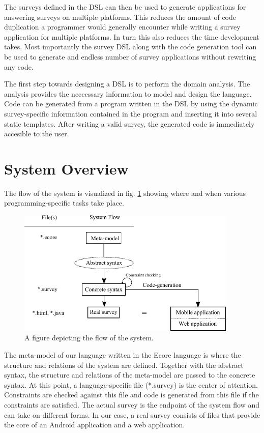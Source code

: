 \documentclass[runningheads]{llncs}
\begin{document}
The surveys defined in the DSL can then be used to generate applications for answering surveys on multiple platforms. This reduces the amount of code duplication a programmer would generally encounter while writing a survey application for multiple platforms. In turn this also reduces the time development takes. Most importantly the survey DSL along with the code generation tool can be used to generate and endless number of survey applications without rewriting any code. 

The first step towards designing a DSL is to perform the domain analysis. The analysis provides the neccessary information to model and design the language. Code can be generated from a program written in the DSL by using the dynamic survey-specific information contained in the program and inserting it into several static templates. After writing a valid survey, the generated code is immediately accesible to the user. 

\section{System Overview}
The flow of the system is visualized in fig. \ref{fig:flow} showing where and when various programming-specific tasks take place.
\begin{figure}
\centering
\includegraphics[height=6cm]{systemflow}
\caption{A figure depicting the flow of the system.}
\label{fig:flow}
\end{figure}
The meta-model of our language written in the Ecore language is where the structure and relations of the system are defined. Together with the abstract syntax, the structure and relations of the meta-model are passed to the concrete syntax. At this point, a language-specific file (*.survey) is the center of attention. Constraints are checked against this file and code is generated from this file if the constraints are satisfied. The actual survey is the endpoint of the system flow and can take on different forms. In our case, a real survey consists of files that provide the core of an Android application and a web application. 
\end{document}
